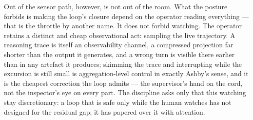 \documentclass[11pt,a4paper,twocolumn]{article}
\begin{document}
Out of the sensor path, however, is not out of the room. What
the posture forbids is making the loop's closure depend on the
operator reading everything --- that is the throttle by another
name. It does not forbid watching. The operator retains a
distinct and cheap observational act: sampling the live
trajectory. A reasoning trace is itself an observability
channel, a compressed projection far shorter than the output it
generates, and a wrong turn is visible there earlier than in any
artefact it produces; skimming the trace and interrupting while
the excursion is still small is aggregation-level control in
exactly Ashby's sense, and it is the cheapest correction the
loop admits --- the supervisor's hand on the cord, not the
inspector's eye on every part. The discipline asks only that
this watching stay discretionary: a loop that is safe only while
the human watches has not designed for the residual gap; it has
papered over it with attention.
\end{document}
